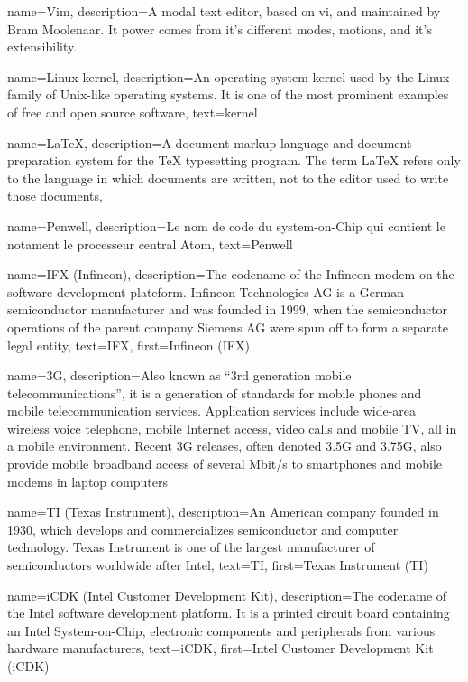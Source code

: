 {
  name=Vim,
  description={A modal text editor, based on vi, and maintained by Bram Moolenaar.
  It power comes from it's different modes, motions, and it's extensibility.}
}

{
  name=Linux kernel,
  description={An operating system kernel used by the Linux family of
    Unix-like operating systems. It is one of the most prominent
    examples of free and open source software},
  text=kernel
}

{
  name=\LaTeX,
  description={A document markup language and document preparation
    system for the TeX typesetting program. The term LaTeX refers only
    to the language in which documents are written, not to the editor
    used to write those documents},
}

{
  name=Penwell,
  description={Le nom de code du system-on-Chip qui contient le notament le processeur
   central Atom},
  text=Penwell
}

{
  name=IFX (Infineon),
  description={The codename of the Infineon modem on the software
    development plateform. Infineon Technologies AG is a German
    semiconductor manufacturer and was founded in 1999, when the
    semiconductor operations of the parent company Siemens AG were
    spun off to form a separate legal entity},
  text=IFX,
  first=Infineon (IFX)
}

{
  name=3G,
  description={Also known as ``3rd generation mobile
    telecommunications'', it is a generation of standards for mobile
    phones and mobile telecommunication services. Application services
    include wide-area wireless voice telephone, mobile Internet
    access, video calls and mobile TV, all in a mobile
    environment. Recent 3G releases, often denoted 3.5G and 3.75G,
    also provide mobile broadband access of several Mbit/s to
    smartphones and mobile modems in laptop computers}
}

{
  name=TI (Texas Instrument),
  description={An American company founded in 1930, which develops and
    commercializes semiconductor and computer technology. Texas
    Instrument is one of the largest manufacturer of semiconductors
    worldwide after Intel},
  text=TI,
  first=Texas Instrument (TI)
}

{
  name=iCDK (Intel Customer Development Kit),
  description={The codename of the Intel software development
    platform. It is a printed circuit board containing an Intel
    System-on-Chip, electronic components and peripherals from various
    hardware manufacturers},
  text=iCDK,
  first=Intel Customer Development Kit (iCDK)
}

